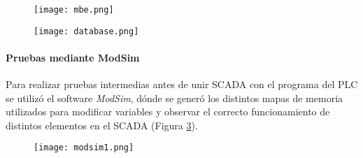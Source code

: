 \begin{figure}[h!]
	\centering
	\texttt{[image: mbe.png]}
	\label{fig:mbe}
\end{figure}
\begin{figure}[h!]
	\centering
	\texttt{[image: database.png]}
	\label{fig:database}
\end{figure}


\paragraph{Pruebas mediante ModSim}
Para realizar pruebas intermedias antes de unir SCADA con el programa del PLC se utilizó el software \textit{ModSim}, dónde se generó los distintos mapas de memoria utilizados para modificar variables y observar el correcto funcionamiento de distintos elementos en el SCADA (Figura \ref{fig:modsim1}).

\begin{figure}[h!]
	\centering
	\texttt{[image: modsim1.png]}
	\label{fig:modsim1}
\end{figure}






